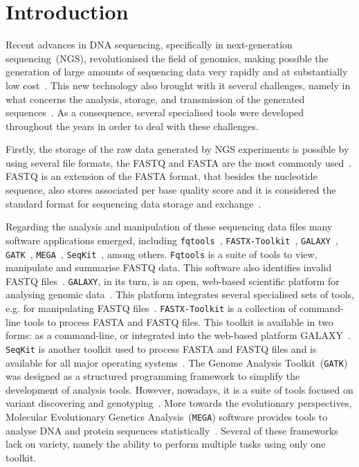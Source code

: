 \chapter{Introduction}
\label{intro}

Recent advances in {DNA} sequencing, specifically in next-generation sequencing~(NGS), revolutionised the field of genomics, making possible the generation of large amounts of sequencing data very rapidly and at substantially low cost~\cite{mardis2017dna}. This new technology also brought with it several challenges, namely in what concerns the analysis, storage, and transmission of the generated sequences~\cite{brouwer2016current,liu2012comparison}. As a consequence, several specialised tools were developed throughout the years in order to deal with these challenges.

Firstly, the storage of the raw data generated by NGS experiments is possible by using several file formats, the FASTQ and FASTA are the most commonly used~\cite{zhang2016overview}. %
FASTQ is an extension of the FASTA format, that besides the nucleotide sequence, also stores associated per base quality score and it is considered the standard format for sequencing data storage and exchange~\cite{cock2009sanger}.

Regarding the analysis and manipulation of these sequencing data files many software applications emerged, including \texttt{fqtools}~\cite{droop2016fqtools},
\texttt{FASTX-Toolkit}~\cite{gordon2010fastx},
\texttt{GALAXY}~\cite{afgan2018galaxy}, \texttt{GATK}~\cite{depristo2011framework},
\texttt{MEGA}~\cite{kumar2016mega7}, \texttt{SeqKit}~\cite{shen2016seqkit}, among others. \texttt{Fqtools} is a suite of tools to view, manipulate and summarise FASTQ data. This software also identifies invalid FASTQ files~\cite{droop2016fqtools}. \texttt{GALAXY}, in its turn, is an open, web-based scientific platform for analysing genomic data~\cite{goecks2010galaxy}. This platform integrates several specialised sets of tools, e.g. for manipulating FASTQ files~\cite{blankenberg2010manipulation}.
\texttt{FASTX-Toolkit} is a collection of command-line tools to process FASTA and FASTQ files. This toolkit is available in two forms: as a command-line, or integrated into the web-based platform GALAXY~\cite{gordon2010fastx}. \texttt{SeqKit} is another toolkit used to process FASTA and FASTQ files and is available for all major operating systems~\cite{shen2016seqkit}. The Genome Analysis Toolkit~(\texttt{GATK}) was designed as a structured programming framework to simplify the development of analysis tools. However, nowadays, it is a suite of tools focused on variant discovering and genotyping~\cite{van2013fastq}. More towards the evolutionary perspectives, Molecular Evolutionary Genetics Analysis~(\texttt{MEGA}) software provides tools to analyse DNA and protein sequences statistically~\cite{tamura2011mega5}. Several of these frameworks lack on variety, namely the ability to perform multiple tasks using only one toolkit.

